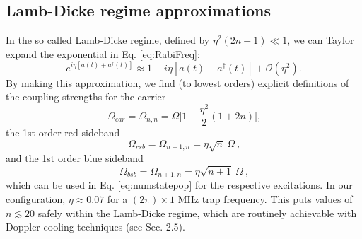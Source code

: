 \subsection{Lamb-Dicke regime approximations}
In the so called Lamb-Dicke regime, defined by ${\eta^2 (2n + 1) \ll 1}$, we can Taylor expand the exponential in Eq. \ref{eq:RabiFreq}:
\begin{equation}
e^{ i \eta [a(t) + a^{\dagger}(t) ] } \approx 1 + i \eta [a(t) + a^{\dagger}(t) ] + \mathcal{O}(\eta^2) \text{.}
\end{equation}
By making this approximation, we find (to lowest orders) explicit definitions of the coupling strengths for the carrier
\begin{equation}
\Omega_{car} = \Omega_{n,n} = \Omega \big[1 - \frac{\eta^2}{2}(1 + 2n) \big] \text{,}
\label{eq:Omega_car}
\end{equation}
the 1st order red sideband
\begin{equation}
\Omega_{rsb} = \Omega_{n-1,n} = \eta \sqrt{n} \ \Omega \ \text{,}
\label{eq:Omega_rsb}
\end{equation}
and the 1st order blue sideband
\begin{equation}
\Omega_{bsb} = \Omega_{n+1,n} = \eta \sqrt{n+1} \ \Omega \ \text{,}
\label{eq:Omega_bsb}
\end{equation}
which can be used in Eq. \ref{eq:numstatepop} for the respective excitations. In our configuration, $\eta \approx 0.07$ for a $(2 \pi) \times 1$ MHz trap frequency. This puts values of $n \lesssim 20$ safely within the Lamb-Dicke regime, which are routinely achievable with Doppler cooling techniques (see Sec. 2.5).


